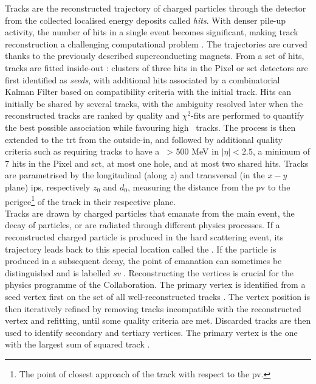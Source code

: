 Tracks are the reconstructed trajectory of charged particles through the detector from the collected localised energy deposits called \textit{hits}. With denser pile-up activity, the number of hits in a single event becomes significant, making track reconstruction a challenging computational problem \cite{ATL-PHYS-PUB-2015-006, ATLAS-tracks-algo,}. The trajectories are curved thanks to the previously described superconducting magnets. From a set of hits, tracks are fitted inside-out \cite{ATLAS-tracks-algo}: clusters of three hits in the Pixel or \gls{sct} detectors are first identified as \textit{seeds}, with additional hits associated by a combinatorial Kalman Filter \cite{10.1115/1.3662552} based on compatibility criteria with the initial track. Hits can initially be shared by several tracks, with the ambiguity resolved later when the reconstructed tracks are ranked by quality and $\chi^2$-fits are performed to quantify the best possible association while favouring high \pt\ tracks. The process is then extended to the \gls{trt} from the outside-in, and followed by additional quality criteria such as requiring tracks to have a \pt\ > 500 MeV in $|\eta| < 2.5$, a minimum of 7 hits in the Pixel and \gls{sct}, at most one hole, and at most two shared hits. Tracks are parametrised by the longitudinal (along $z$) and transversal (in the $x-y$ plane) \glspl{ip}, respectively $z_0$ and $d_0$, measuring the distance from the \gls{pv} to the perigee\footnote{The point of closest approach of the track with respect to the \gls{pv}.} of the track in their respective plane. \\

Tracks are drawn by charged particles that emanate from the main event, the decay of particles, or are radiated through different physics processes. If a reconstructed charged particle is produced in the hard scattering event, its trajectory leads back to this special location called the \textit{} \cite{ATLAS:2016nnj}. If the particle is produced in a subsequent decay, the point of emanation can sometimes be distinguished and is labelled \textit{\gls{sv}} \cite{Kostyukhin:685551}. Reconstructing the vertices is crucial for the physics programme of the Collaboration. The primary vertex is identified from a seed vertex first on the set of all well-reconstructed tracks \cite{ATL-PHYS-PUB-2015-026}. The vertex position is then iteratively refined by removing tracks incompatible with the reconstructed vertex and refitting, until some quality criteria are met. Discarded tracks are then used to identify secondary and tertiary vertices. The primary vertex is the one with the largest sum of squared track \pt. \\

